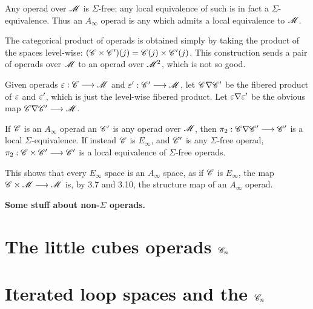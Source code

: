 \documentclass[11pt]{article}
\begin{document}
\begin{lem*}[3.7]
Any operad over $\mathscr{M}$ is $\Sigma$-free; any local equivalence of such is
in fact a $\Sigma$-equivalence.
Thus an $A_\infty$ operad is any which admits a local equivalence to $\mathscr{M}$.
\end{lem*}
The categorical product of operads is obtained simply by taking the product
of the spaces level-wise: $(\mathscr{C}\times\mathscr{C}')(j)=\mathscr{C}(j)\times\mathscr{C}'(j)$.
This construction sends a pair of operads over $\mathscr{M}$ to an operad over
$\mathscr{M}^2$, which is not so good.
\begin{defn*}[3.9]
Given operads $\varepsilon:\mathscr{C}\longrightarrow\mathscr{M}$ and $\varepsilon':\mathscr{C}'\longrightarrow\mathscr{M}$, let 
$\mathscr{C}\nabla\mathscr{C}'$ be the fibered product of $\varepsilon$ and $\varepsilon'$, which is
just the level-wise fibered product. Let $\varepsilon\nabla\varepsilon'$ be the obvious
map $\mathscr{C}\nabla\mathscr{C}'\longrightarrow\mathscr{M}$.
\end{defn*}
\begin{prop*}[3.10]
If $\mathscr{C}$ is an $A_\infty$ operad an $\mathscr{C}'$ is any operad over $\mathscr{M}$, then
$\pi_2:\mathscr{C}\nabla\mathscr{C}'\longrightarrow\mathscr{C}'$ is a local $\Sigma$-equivalence. If instead
$\mathscr{C}$ is $E_\infty$, and $\mathscr{C}'$ is any $\Sigma$-free operad,
$\pi_2:\mathscr{C}\times\mathscr{C}'\longrightarrow\mathscr{C}'$ is a local equivalence of $\Sigma$-free
operads.
\end{prop*}\noindent
This shows that every $E_\infty$ space is an $A_\infty$ space, as if $\mathscr{C}$
is $E_\infty$, the map $\mathscr{C}\times\mathscr{M}\longrightarrow\mathscr{M}$ is, by 3.7 and 3.10,
the structure map of an $A_\infty$ operad. 

\noindent\textbf{Some stuff about non-$\Sigma$ operads.}
\section{The little cubes operads \texorpdfstring{$\mathscr{C}_n$}{Cn}}
\section{Iterated loop spaces and the \texorpdfstring{$\mathscr{C}_n$}{Cn}}
\end{document}
